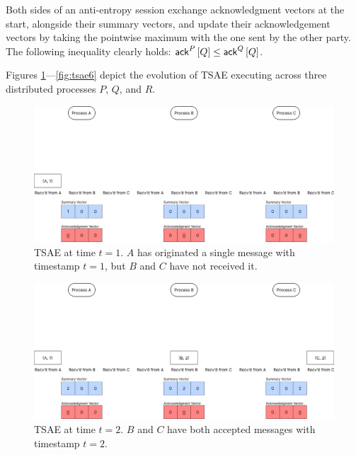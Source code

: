 \documentclass[]             %
{NASA}                       %
\theoremstyle{definition}
\begin{document}
Both sides of an anti-entropy session exchange acknowledgment vectors
at the start, alongside their summary vectors, and update their
acknowledgement vectors by taking the pointwise maximum with the one
sent by the other party. The following inequality clearly holds: $\textsf{ack}^{P}\left[Q\right] \leq \textsf{ack}^{Q}\left[Q\right]$.

Figures \ref{fig:tsae1}---\ref{fig:tsae6} depict the evolution of TSAE
executing across three distributed processes $P$, $Q$, and $R$.

\newpage
\begin{landscape}
  \begin{figure}%
  \end{figure}
  \begin{figure}[h]
    \centering
    \includegraphics[width=1.4\textwidth]{images/tsae/TSAE1.png}
    \caption{TSAE at time $t=1$. $A$ has originated a single message with timestamp $t=1$, but $B$ and $C$ have not received it.}
    \label{fig:tsae1}
  \end{figure}
  \begin{figure}[h]
    \centering
    \includegraphics[width=1.4\textwidth]{images/tsae/TSAE2.png}
    \caption{TSAE at time $t=2$. $B$ and $C$ have both accepted messages with timestamp $t=2$.}

\end{figure}
\end{landscape}
\end{document}
